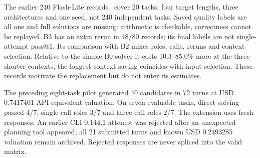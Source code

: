 
The earlier 240 Flash-Lite records~\cite{inotresearch2026} cover 20 tasks, four target lengths, three architectures and one seed, not 240 independent tasks. Saved quality labels are all one and full solutions are missing: arithmetic is checkable, correctness cannot be replayed. B3 has an extra rerun in 48/80 records; its final labels are not single-attempt pass@1. Its comparison with B2 mixes roles, calls, reruns and context selection. Relative to the simple B0 solver it costs 10.3--85.0\% more at the three shorter contexts; the longest-context saving coincides with input selection. These records motivate the replacement but do not enter its estimates.

The preceding eight-task pilot generated 40 candidates in 72 turns at USD 0.7417401 API-equivalent valuation. On seven evaluable tasks, direct solving passed 4/7, single-call roles 3/7 and three-call roles 2/7. The extension uses fresh responses. An earlier CLI 0.144.1 attempt was rejected after an unexpected planning tool appeared; all 21 submitted turns and known USD 0.2493285 valuation remain archived. Rejected responses are never spliced into the valid matrix.

